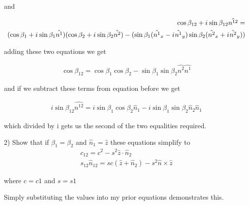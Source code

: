 \documentclass[12pt, letterpaper, twoside]{article}
\newcommand{\iu}{{i\mkern1mu}}
\begin{document}
and

\begin{align*}
    \cos{\beta_{12}} + \iu \sin{\beta_{12}}\hat{n^{12}} = \\
    (\cos{\beta_{1}} + \iu \sin{\beta_{1}}\hat{n^{1}})(\cos{\beta_{2}} + \iu \sin{\beta_{2}}\hat{n^{2}}) - (\sin{\beta_{1}}(\hat{n^1}_x - \iu \hat{n^1}_y)\sin{\beta_{2}}(\hat{n^2}_x + \iu \hat{n^2}_y))
\end{align*}

adding these two equations we get

\begin{align*}
\cos{\beta_{12}} = \cos{\beta_{1}}\cos{\beta_{2}} - \sin{\beta_{1}}\sin{\beta_{2}} \hat{n^2} \hat{n^1}
\end{align*}

and if we subtract these terms from equation before we get

\begin{align*}
    i\sin{\beta_{12}}\hat{n^{12}} = i\sin{\beta_1}\cos{\beta_2}\hat{n}_1 - i\sin{\beta_1}\sin{\beta_2}\hat{n}_2\hat{n}_1
\end{align*}

which divided by i gets us the second of the two equalities required.

2) Show that if $\beta_1 = \beta_2$ and $\hat{n}_1 = \hat{z}$ these equations simplify to
\begin{align*}
    c_{12} = c^2 - s^2\hat{z} \cdot \hat{n}_2 \\
    s_{12}\hat{n}_12 = sc(\hat{z} + \hat{n}_2) - s^2\hat{n} \times \hat{z}
\end{align*}

where $c = c1$ and $s = s1$

Simply substituting the values into my prior equations demonstrates this.
\end{document}
